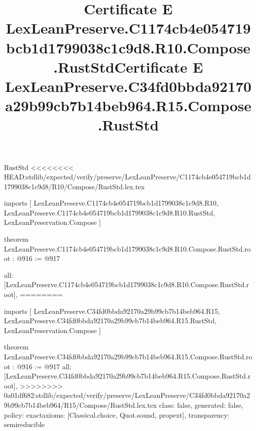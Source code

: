 \begin{lexlean}{RustStd}
<<<<<<<< HEAD:stdlib/expected/verify/preserve/LexLeanPreserve/C1174cb4e054719bcb1d1799038c1c9d8/R10/Compose/RustStd.lex.tex
\title{Certificate E LexLeanPreserve.C1174cb4e054719bcb1d1799038c1c9d8.R10.Compose.RustStd}
\begin{coremodule}
imports [
  LexLeanPreserve.C1174cb4e054719bcb1d1799038c1c9d8.R10,
  LexLeanPreserve.C1174cb4e054719bcb1d1799038c1c9d8.R10.RustStd,
  LexLeanPreservation.Compose
]

theorem LexLeanPreserve.C1174cb4e054719bcb1d1799038c1c9d8.R10.Compose.RustStd.root : @916 := @917 {
  all: [LexLeanPreserve.C1174cb4e054719bcb1d1799038c1c9d8.R10.Compose.RustStd.root],
========
\title{Certificate E LexLeanPreserve.C34fd0bbda92170a29b99cb7b14beb964.R15.Compose.RustStd}
\begin{coremodule}
imports [
  LexLeanPreserve.C34fd0bbda92170a29b99cb7b14beb964.R15,
  LexLeanPreserve.C34fd0bbda92170a29b99cb7b14beb964.R15.RustStd,
  LexLeanPreservation.Compose
]

theorem LexLeanPreserve.C34fd0bbda92170a29b99cb7b14beb964.R15.Compose.RustStd.root : @916 := @917 {
  all: [LexLeanPreserve.C34fd0bbda92170a29b99cb7b14beb964.R15.Compose.RustStd.root],
>>>>>>>> 0a01df682:stdlib/expected/verify/preserve/LexLeanPreserve/C34fd0bbda92170a29b99cb7b14beb964/R15/Compose/RustStd.lex.tex
  class: false,
  generated: false,
  policy: exact{axioms: [Classical.choice, Quot.sound, propext]},
  transparency: semireducible
}


\end{coremodule}}
\end{coremodule}
\end{lexlean}
